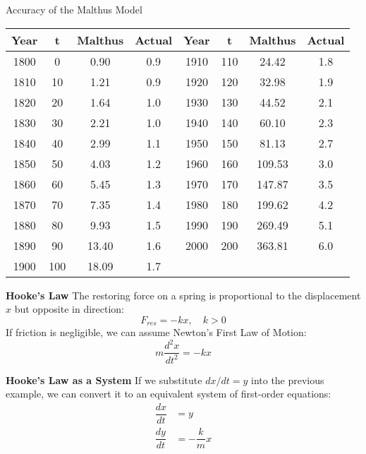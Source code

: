 \documentclass{beamer}
\begin{document}
\begin{frame}
\begin{block}{Accuracy of the Malthus Model}
\begin{center}
\begin{tabular}{cccc|cccc}
\textbf{Year} & \textbf{t} & \textbf{Malthus} & \textbf{Actual} &
\textbf{Year} & \textbf{t} & \textbf{Malthus} & \textbf{Actual} \\\hline
1800 & 0   & \phantom{1}0.90 & 0.9 & 1910 & 110 & \phantom{1}24.42 & 1.8 \\  
1810 & 10  & \phantom{1}1.21 & 0.9 & 1920 & 120 & \phantom{1}32.98 & 1.9 \\
1820 & 20  & \phantom{1}1.64 & 1.0 & 1930 & 130 & \phantom{1}44.52 & 2.1 \\
1830 & 30  & \phantom{1}2.21 & 1.0 & 1940 & 140 & \phantom{1}60.10 & 2.3 \\
1840 & 40  & \phantom{1}2.99 & 1.1 & 1950 & 150 & \phantom{1}81.13 & 2.7 \\
1850 & 50  & \phantom{1}4.03 & 1.2 & 1960 & 160 &           109.53 & 3.0 \\
1860 & 60  & \phantom{1}5.45 & 1.3 & 1970 & 170 &           147.87 & 3.5 \\
1870 & 70  & \phantom{1}7.35 & 1.4 & 1980 & 180 &           199.62 & 4.2 \\
1880 & 80  & \phantom{1}9.93 & 1.5 & 1990 & 190 &           269.49 & 5.1 \\
1890 & 90  &           13.40 & 1.6 & 2000 & 200 &           363.81 & 6.0 \\
1900 & 100 &           18.09 & 1.7 &      &     &                  &
\end{tabular}
\end{center}
\end{block}
\end{frame}

\begin{frame}
\begin{example}
\textbf{Hooke's Law} The restoring force on a spring is proportional to the displacement $x$ but opposite in direction:
\begin{equation*}
F_{res}=-kx,\quad k>0
\end{equation*}
If friction is negligible, we can assume Newton's First Law of Motion:
\begin{equation*}
m\dfrac{d^2 x}{dt^2} = -kx
\end{equation*}
\end{example}\pause

\begin{example}
\textbf{Hooke's Law as a System} If we substitute $dx/dt=y$ into the previous example, we can convert it to an equivalent system of first-order equations:
\begin{equation*}
\begin{aligned}
\dfrac{dx}{dt} & =y \\
\dfrac{dy}{dt} & =-\dfrac{k}{m}x
\end{aligned}
\end{equation*}
\end{example}
\end{frame}
\end{document}
